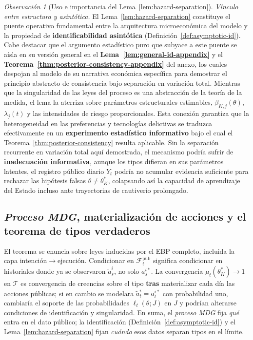 \documentclass[12pt]{article}
\theoremstyle{definition}
\theoremstyle{remark}
\newtheorem{remark}[theorem]{Observación}
\newcommand{\1}{\mathbf{1}}
\begin{document}
\begin{remark}[Uso e importancia del Lema~\ref{lem:hazard-separation}]
\noindent\emph{Vínculo entre estructura y asintótica.} El Lema~\ref{lem:hazard-separation} constituye el puente operativo fundamental entre la arquitectura microeconómica del modelo y la propiedad de \textbf{identificabilidad asintótica} (Definición~\ref{def:asymptotic-id}). Cabe destacar que el argumento estadístico puro que subyace a este puente se aísla en su versión general en el \textbf{Lema~\ref{lem:general-id-appendix}} y el \textbf{Teorema~\ref{thm:posterior-consistency-appendix}} del anexo, los cuales despojan al modelo de su narrativa económica específica para demostrar el principio abstracto de consistencia bajo separación en variación total. Mientras que la singularidad de las leyes del proceso es una abstracción de la teoría de la medida, el lema la aterriza sobre parámetros estructurales estimables, $\beta_{K,j}(\theta)$, $\lambda_j(t)$ y las intensidades de riesgo proporcionales. Esta conexión garantiza que la heterogeneidad en las preferencias y tecnologías delictivas se traduzca efectivamente en un \textbf{experimento estadístico informativo} bajo el cual el Teorema~\ref{thm:posterior-consistency} resulta aplicable. Sin la separación recurrente en variación total aquí demostrada, el mecanismo podría sufrir de \textbf{inadecuación informativa}, aunque los tipos difieran en sus parámetros latentes, el registro público diario $Y_t$ podría no acumular evidencia suficiente para rechazar las hipótesis falsas $\theta \neq \theta_K^\ast$, colapsando así la capacidad de aprendizaje del Estado incluso ante trayectorias de cautiverio prolongado.
\end{remark}

\subsection{\textit{Proceso MDG}, materialización de acciones y el teorema de tipos verdaderos}
\label{subsec:mano-dios-asymptotic}
\medskip
El teorema se enuncia sobre leyes inducidas por el EBP completo, incluida la capa intención$\to$ejecución. Condicionar en $\mathcal{F}_t^{\mathrm{pub}}$ significa condicionar en historiales donde ya se observaron $\tilde{a}_s^i$, no solo $a_s^{i\ast}$. La convergencia $\mu_t(\theta_K^\ast)\to 1$ en $\mathcal{T}$ es convergencia de creencias sobre el tipo \textbf{tras} materializar cada día las acciones públicas; si en cambio se modelara $\tilde{a}_t^i=a_t^{i\ast}$ con probabilidad uno, cambiaría el soporte de las probabilidades $\ell_t(\theta;J)$ en $J$ y podrían alterarse condiciones de identificación y singularidad. En suma, el \textit{proceso MDG} fija \emph{qué} entra en el dato público; la identificación \textup{(}Definición~\ref{def:asymptotic-id}\textup{)} y el Lema~\ref{lem:hazard-separation} fijan \emph{cuándo} esos datos separan tipos en el límite.
\end{document}
